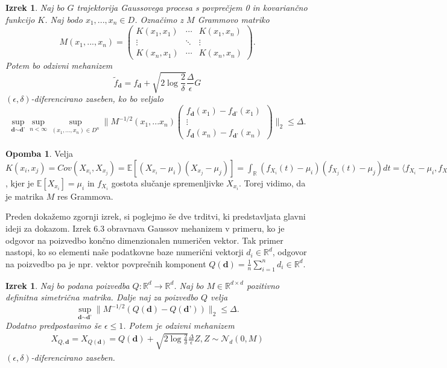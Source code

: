\documentclass[12pt,a4paper]{amsart}
\theoremstyle{definition} %
\newtheorem{opomba}[definicija]{Opomba}
\theoremstyle{plain} %
\newtheorem{izrek}[definicija]{Izrek}
\begin{document}
\begin{izrek}
Naj bo $G$ trajektorija Gaussovega procesa s povprečjem 0 in kovariančno funkcijo $K$. Naj bodo $x_1,...,x_n \in D$. Označimo z $M$ Grammovo matriko
$$
M(x_1,...,x_n) = 
 \begin{pmatrix}
  K(x_1,x_1) & \cdots & K(x_1,x_n) \\
  \vdots    & \ddots & \vdots  \\
  K(x_n,x_1) & \cdots & K(x_n,x_n) 
 \end{pmatrix}
.$$
Potem bo odzivni mehanizem 
$$
\widetilde{f}_{\textbf{d}} = f_{\textbf{d}} + \sqrt{2\log{\frac{2}{\delta}}} \frac{\Delta}{\epsilon}G
$$
$(\epsilon, \delta)$-diferencirano zaseben, ko bo veljalo
\begin{equation}\label{meja}
\sup_{\textbf{d} \sim \textbf{d'}} \sup_{n < \infty} \sup_{(x_1,...,x_n) \in D^n} 
\bigg\|M^{-1/2}(x_1,...x_n)
\begin{pmatrix}
  f_{\textbf{d}}(x_1)-f_{\textbf{d'}}(x_1)  \\
  \vdots     \\
  f_{\textbf{d}}(x_n)-f_{\textbf{d'}}(x_n)
 \end{pmatrix}
\bigg\|_2 \leq \Delta. \tag{6}
\end{equation}
\end{izrek}
\begin{opomba}
Velja $K(x_i, x_j) = Cov(X_{x_i}, X_{x_j}) = \mathbb{E}[(X_{x_i} - \mu_i)(X_{x_j} - \mu_j)] = \int_{\mathbb{R}} (f_{X_i}(t) - \mu_i)(f_{X_j}(t) - \mu_j)dt = \langle f_{X_i} - \mu_i, f_{X_j} - \mu_j \rangle_{L^2}$, kjer je $\mathbb{E}[X_{x_i}] = \mu_i$ in $f_{X_i}$ gostota slučanje spremenljivke $X_{x_i}$. Torej vidimo, da je matrika $M$ res Grammova.
\end{opomba}
Preden dokažemo zgornji izrek, si poglejmo še dve trditvi, ki predstavljata glavni ideji za dokazom. Izrek 6.3 obravnava Gaussov mehanizem v primeru, ko je odgovor na poizvedbo končno dimenzionalen numeričen vektor. Tak primer nastopi, ko so elementi naše podatkovne baze numerični vektorji $d_i \in \mathbb{R}^d$, odgovor na poizvedbo pa je  npr. vektor povprečnih komponent $Q(\textbf{d}) = \frac{1}{n} \sum_{i=1}^{n} d_i \in \mathbb{R}^d$.
\begin{izrek}
Naj bo podana poizvedba $Q: \mathbb{R}^d \rightarrow \mathbb{R}^d$. Naj bo $M \in \mathbb{R}^{d \times d}$ pozitivno definitna simetrična matrika. Dalje naj za poizvedbo $Q$ velja 
\begin{equation}\label{mejagauss}
\sup_{\textbf{d} \sim \textbf{d'}} \| M^{-1/2}(Q(\textbf{d})-Q(\textbf{d'}))\|_{2} \leq \Delta. \tag{7}
\end{equation}
Dodatno predpostavimo še $\epsilon \leq 1$. Potem je odzivni mehanizem 
\begin{gather*}
X_{Q,\textbf{d}} = X_{Q(\textbf{d})} = Q(\textbf{d}) + \sqrt{2\log{\frac{2}{\delta}}} \frac{\Delta}{\epsilon} Z, Z \sim \mathcal{N}_d (0,M)
\end{gather*}
$(\epsilon, \delta)$-diferencirano zaseben.
\end{izrek}
\end{document}
